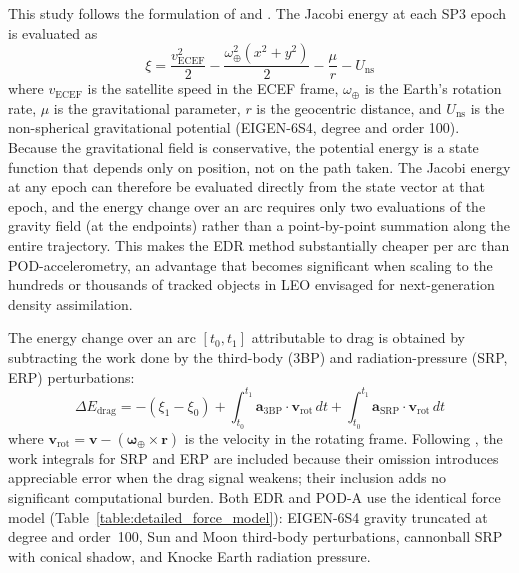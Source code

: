 \documentclass{agujournal2019}
\begin{document}
This study follows the formulation of
 and .
The Jacobi energy at each SP3 epoch is evaluated as
\begin{equation}
\xi = \frac{v_{\text{ECEF}}^2}{2}
    - \frac{\omega_{\oplus}^2(x^2 + y^2)}{2}
    - \frac{\mu}{r}
    - U_{\text{ns}}
\end{equation}
where $v_{\text{ECEF}}$ is the satellite speed in the ECEF frame,
$\omega_{\oplus}$ is the Earth's rotation rate, $\mu$ is the gravitational
parameter, $r$ is the geocentric distance, and $U_{\text{ns}}$ is the
non-spherical gravitational potential (EIGEN-6S4, degree and order 100).
Because the gravitational field is conservative, the potential energy is a
state function that depends only on position, not on the path taken. The
Jacobi energy at any epoch can therefore be evaluated directly from the
state vector at that epoch, and the energy change over an arc requires only
two evaluations of the gravity field (at the endpoints) rather than a
point-by-point summation along the entire trajectory. This makes the EDR
method substantially cheaper per arc than POD-accelerometry, an advantage
that becomes significant when scaling to the hundreds or thousands of
tracked objects in LEO envisaged for next-generation density assimilation.

The energy change over an arc $[t_0, t_1]$ attributable to drag is obtained
by subtracting the work done by the third-body (3BP) and radiation-pressure
(SRP, ERP) perturbations:
\begin{equation}
\Delta E_{\text{drag}} = -(\xi_1 - \xi_0)
  + \int_{t_0}^{t_1} \mathbf{a}_{\text{3BP}} \cdot \mathbf{v}_{\text{rot}}\, dt
  + \int_{t_0}^{t_1} \mathbf{a}_{\text{SRP}} \cdot \mathbf{v}_{\text{rot}}\, dt
\end{equation}
where $\mathbf{v}_{\text{rot}} = \mathbf{v} -
(\boldsymbol{\omega}_{\oplus} \times \mathbf{r})$ is the velocity in the
rotating frame. Following , the work integrals for
SRP and ERP are included because their omission introduces appreciable error
when the drag signal weakens; their inclusion adds no significant computational
burden. Both EDR and POD-A use the identical force model
(Table~\ref{table:detailed_force_model}): EIGEN-6S4 gravity truncated at
degree and order~100, Sun and Moon third-body perturbations, cannonball SRP
with conical shadow, and Knocke Earth radiation pressure.
\end{document}
